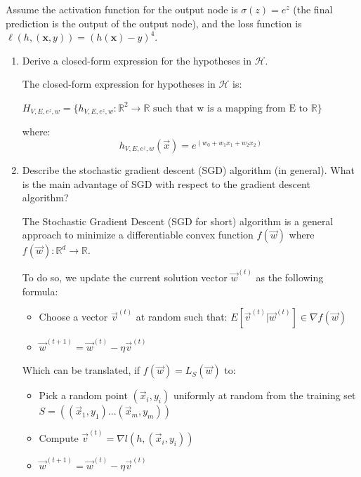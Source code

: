 \documentclass[a4paper,11pt,oneside]{book}
\begin{document}
Assume the activation function for the output node is $\sigma(z) = e^z$ (the final prediction is the output of the output node), and the loss function is $\ell(h, (\mathbf{x}, y)) = (h(\mathbf{x}) - y)^4$.
\begin{enumerate}
\item Derive a closed-form expression for the hypotheses in $\mathcal{H}$.
    \begin{solution}
        The closed-form expression for hypotheses in $\mathcal{H}$ is:
        
        $H_{V,E,e^z,w} = \{h_{V,E,e^z,w}: \mathbb{R}^2 \to \mathbb{R} \text{ such that w is a mapping from E to }\mathbb{R}\}$
        
        where:
        $$h_{V,E,e^z,w}(\vec{x}) = e^{(w_0 + w_1x_1 + w_2x_2)}$$
    \end{solution}

\item Describe the stochastic gradient descent (SGD) algorithm (in general). What is the main advantage of SGD with respect to the gradient descent algorithm?
    \begin{solution}
        The Stochastic Gradient Descent (SGD for short) algorithm is a general approach to minimize a differentiable convex function $f(\vec{w})$ where $f(\vec{w}): \mathbb{R}^d \to \mathbb{R}$.
        
        To do so, we update the current solution vector $\vec{w}^{(t)}$ as the following formula:
        \begin{itemize}
        \item Choose a vector $\vec{v}^{(t)}$ at random such that: $E[\vec{v}^{(t)}|\vec{w}^{(t)}] \in \nabla f(\vec{w})$
        \item $\vec{w}^{(t+1)} = \vec{w}^{(t)} - \eta\vec{v}^{(t)}$
        \end{itemize}
        
        Which can be translated, if $f(\vec{w}) = L_S(\vec{w})$ to:
        \begin{itemize}
        \item Pick a random point $(\vec{x}_i, y_i)$ uniformly at random from the training set $S = ((\vec{x}_1,y_1) ... (\vec{x}_m,y_m))$
        \item Compute $\vec{v}^{(t)} = \nabla l(h, (\vec{x}_i,y_i))$
        \item $\vec{w}^{(t+1)} = \vec{w}^{(t)} - \eta\vec{v}^{(t)}$
        \end{itemize}
        

\end{solution}
\end{enumerate}
\end{document}
